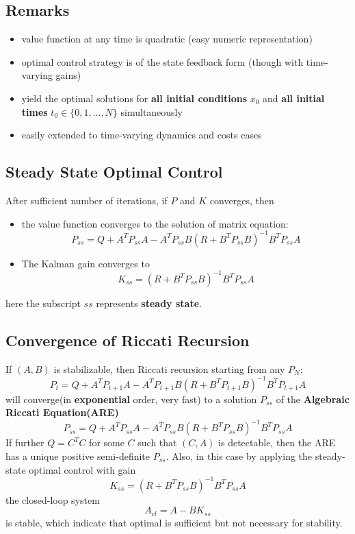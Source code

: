 \documentclass[10pt,a4paper,oneside]{article}
\begin{document}
\subsection{Remarks}

\begin{itemize}
	\item value function at any time is quadratic (easy numeric representation)
	\item optimal control strategy is of the state feedback form (though with time-varying gains)
	\item yield the optimal solutions for \textbf{all initial conditions} $x_0$ and \textbf{all initial times} $t_0\in\{0,1,...,N\}$ simultaneously
	\item easily extended to time-varying dynamics and costs cases
\end{itemize}

\subsection{Steady State Optimal Control}
After sufficient number of iterations, if $P$ and $K$ converges, then
\begin{itemize}
	\item the value function converges to the solution of matrix equation:
	\[
	P_{ss}=Q+A^TP_{ss}A - A^TP_{ss}B(R+B^TP_{ss}B)^{-1}B^TP_{ss}A
	\]
	\item The Kalman gain converges to
	\[
	K_{ss} =(R+B^TP_{ss}B)^{-1}B^TP_{ss}A
	\]
\end{itemize}
here the subscript $ss$ represents \textbf{steady state}.

\subsection{Convergence of Riccati Recursion}
If $(A,B)$ is stabilizable, then Riccati recursion starting from any $P_N$:
\[
P_t=Q+A^TP_{t+1}A - A^TP_{t+1}B(R+B^TP_{t+1}B)^{-1}B^TP_{t+1}A
\]
will converge(in \textbf{exponential} order, very fast) to a solution $P_{ss}$ of the {\bfseries Algebraic Riccati Equation(ARE)}
\[
P_{ss}=Q+A^TP_{ss}A - A^TP_{ss}B(R+B^TP_{ss}B)^{-1}B^TP_{ss}A
\]
If further $Q=C^TC$ for some $C$ such that $(C,A)$ is detectable, then the ARE has a unique positive semi-definite $P_{ss}$. Also, in this case by applying the steady-state optimal control with gain
\[
K_{ss}=(R+B^TP_{ss}B)^{-1}B^TP_{ss}A
\]
the closed-loop system 
\[
A_{cl}=A-BK_{ss}
\] 
is stable, which indicate that optimal is sufficient but not necessary for stability.
\end{document}
